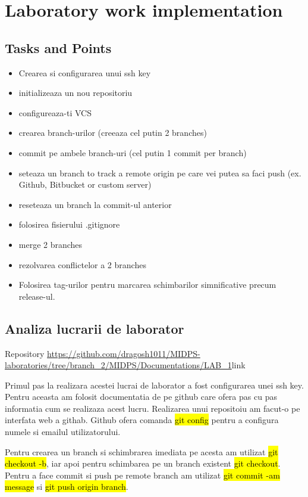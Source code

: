 \section{Laboratory work implementation}

\subsection{Tasks and Points}

\begin{itemize}
	\item Crearea si configurarea unui ssh key
	\item initializeaza un nou repositoriu
\item configureaza-ti VCS
\item crearea branch-urilor (creeaza cel putin 2 branches)
\item commit pe ambele branch-uri (cel putin 1 commit per branch)
\item seteaza un branch to track a remote origin pe care vei putea sa faci push (ex. Github, Bitbucket or custom server)
\item reseteaza un branch la commit-ul anterior
\item folosirea fisierului .gitignore
\item merge 2 branches
\item rezolvarea conflictelor a 2 branches
\item Folosirea tag-urilor pentru marcarea schimbarilor simnificative precum release-ul.
\end{itemize}

\subsection{Analiza lucrarii de laborator}

Repository \url{https://github.com/dragosh1011/MIDPS-laboratories/tree/branch_2/MIDPS/Documentations/LAB_1}{link}

Primul pas la realizara acestei lucrai de laborator a fost configurarea unei ssh key. Pentru aceasta am folosit documentatia de pe github \cite{ssh-key} care ofera pas cu pas informatia cum se realizaza acest lucru. 
Realizarea unui repositoiu am facut-o pe interfata web a githab. Github ofera comanda \hl{git config} pentru a configura numele si emailul utilizatorului.


Pentru crearea un branch si schimbrarea imediata pe acesta am utilizat \hl{git checkout -b}, iar apoi pentru schimbarea pe un branch existent \hl{git checkout}. Pentru a face commit si push pe remote branch am utilizat \hl{git commit -am message} si \hl{git push origin branch}. 

